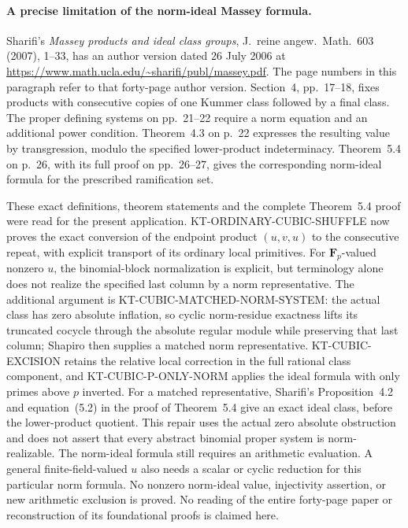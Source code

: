 \paragraph{A precise limitation of the norm-ideal Massey formula.}
Sharifi's \emph{Massey products and ideal class groups},
J.~reine angew.~Math.~603 (2007), 1--33, has an author
version dated 26 July 2006 at
\url{https://www.math.ucla.edu/~sharifi/publ/massey.pdf}.
The page numbers in this paragraph refer to that forty-page
author version.  Section~4, pp.~17--18, fixes products with
consecutive copies of one Kummer class followed by a final
class.  The proper defining systems on pp.~21--22 require
a norm equation and an additional power condition.
Theorem~4.3 on p.~22 expresses the resulting value by
transgression, modulo the specified lower-product
indeterminacy.  Theorem~5.4 on p.~26, with its full proof
on pp.~26--27, gives the corresponding norm-ideal formula
for the prescribed ramification set.

These exact definitions, theorem statements and the complete
Theorem~5.4 proof were read for the present application.
KT-ORDINARY-CUBIC-SHUFFLE now proves the exact conversion
of the endpoint product $(u,v,u)$ to the consecutive repeat,
with explicit transport of its ordinary local primitives.
For $\mathbf F_p$-valued nonzero $u$, the binomial-block
normalization is explicit, but terminology alone does not
realize the specified last column by a norm representative.
The additional argument is KT-CUBIC-MATCHED-NORM-SYSTEM:
the actual class has zero absolute inflation, so cyclic
norm-residue exactness lifts its truncated cocycle through
the absolute regular module while preserving that last
column; Shapiro then supplies a matched norm representative.
KT-CUBIC-EXCISION retains the relative local correction in
the full rational class component, and
KT-CUBIC-P-ONLY-NORM applies the ideal formula with only
primes above $p$ inverted.  For a matched representative,
Sharifi's Proposition~4.2 and equation~(5.2) in the proof
of Theorem~5.4 give an exact ideal class, before the
lower-product quotient.  This repair uses the actual
zero absolute obstruction and does not assert that every
abstract binomial proper system is norm-realizable.
The norm-ideal formula still requires an arithmetic
evaluation.  A general finite-field-valued
$u$ also needs a scalar or cyclic reduction for this
particular norm formula.  No nonzero norm-ideal value,
injectivity assertion, or new arithmetic exclusion is
proved.  No reading of the entire forty-page paper or
reconstruction of its foundational proofs is claimed here.
